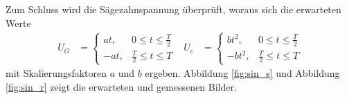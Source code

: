 Zum Schluss wird die Sägezahnspannung überprüft, woraus sich die erwarteten Werte
\begin{align}
  U_G &=
  \begin{cases}
    at , &  0 \leq t \leq \frac{T}{2} \\
    -at , & \frac{T}{2} \leq t \leq T
  \end{cases}
  & U_c &=
  \begin{cases}
    b t^2 , &  0 \leq t \leq \frac{T}{2} \\
    -b t^2 , & \frac{T}{2} \leq t \leq T
  \end{cases}
\end{align}
mit Skalierungsfaktoren $a$ und $b$ ergeben.
Abbildung \ref{fig:sin_s} und Abbildung \ref{fig:sin_r} zeigt die erwarteten und gemessenen Bilder.
